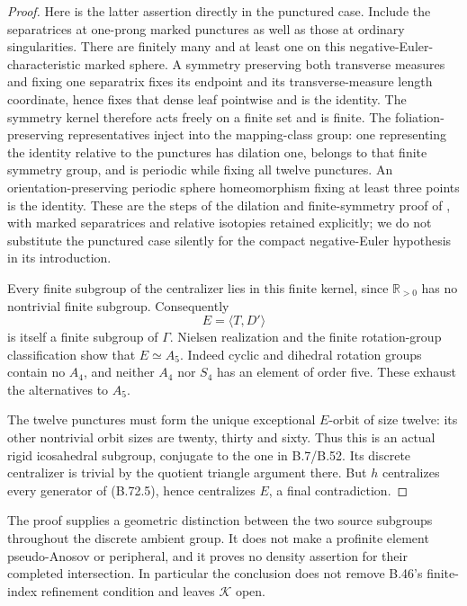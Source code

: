 \begin{proof}
Here is the latter assertion directly in the punctured
case.  Include the separatrices at one-prong marked
punctures as well as those at ordinary singularities.
There are finitely many and at least one on this
negative-Euler-characteristic marked sphere.
A symmetry preserving both transverse measures and
fixing one separatrix fixes its endpoint and its
transverse-measure length coordinate, hence fixes
that dense leaf pointwise and is the identity.
The symmetry kernel therefore acts freely on a finite
set and is finite.
The foliation-preserving representatives inject into
the mapping-class group: one representing the identity
relative to the punctures has dilation one, belongs
to that finite symmetry group, and is periodic while
fixing all twelve punctures.  An orientation-preserving
periodic sphere homeomorphism fixing at least three
points is the identity.
These are the steps of the dilation and finite-symmetry
proof of \citet[Lemmas 1--4]{DE_McCarthy1994}, with marked
separatrices and relative isotopies retained explicitly;
we do not substitute the punctured case silently for
the compact negative-Euler hypothesis in its introduction.

Every finite subgroup of the centralizer lies in this
finite kernel, since $\mathbb R_{>0}$ has no nontrivial
finite subgroup.  Consequently
\[
                         E=\langle T,D'\rangle
                                                               \tag{B.72.5}
\]
is itself a finite subgroup of $\Gamma$.
Nielsen realization and the finite rotation-group
classification show that $E\simeq A_5$.
Indeed cyclic and dihedral rotation groups contain
no $A_4$, and neither $A_4$ nor $S_4$ has an element
of order five.  These exhaust the alternatives to $A_5$.

The twelve punctures must form the unique exceptional
$E$-orbit of size twelve: its other nontrivial orbit
sizes are twenty, thirty and sixty.
Thus this is an actual rigid icosahedral subgroup,
conjugate to the one in B.7/B.52.
Its discrete centralizer is trivial by the quotient
triangle argument there.
But $h$ centralizes every generator of (B.72.5), hence
centralizes $E$, a final contradiction.
\end{proof}

The proof supplies a geometric distinction between the
two source subgroups throughout the discrete ambient group.
It does not make a profinite element pseudo-Anosov or
peripheral, and it proves no density assertion for their
completed intersection.  In particular the conclusion
does not remove B.46's finite-index refinement condition
and leaves $\mathcal K$ open.
